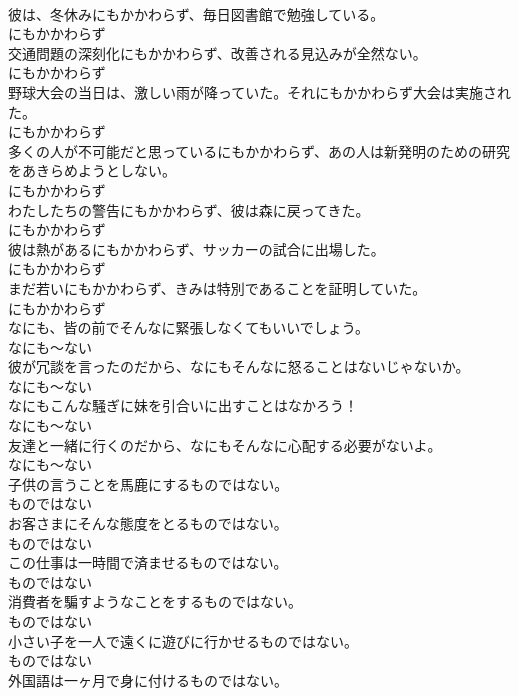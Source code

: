 \documentclass[8pt]{extreport}
\begin{document}
\begin{CJK}{UTF8}{min}
\\	彼は、冬休みにもかかわらず、毎日図書館で勉強している。	
\\	にもかかわらず
\\	交通問題の深刻化にもかかわらず、改善される見込みが全然ない。	
\\	にもかかわらず
\\	野球大会の当日は、激しい雨が降っていた。それにもかかわらず大会は実施された。	
\\	にもかかわらず
\\	多くの人が不可能だと思っているにもかかわらず、あの人は新発明のための研究をあきらめようとしない。	
\\	にもかかわらず
\\	わたしたちの警告にもかかわらず、彼は森に戻ってきた。	
\\	にもかかわらず
\\	彼は熱があるにもかかわらず、サッカーの試合に出場した。	
\\	にもかかわらず
\\	まだ若いにもかかわらず、きみは特別であることを証明していた。	
\\	にもかかわらず
\\	なにも、皆の前でそんなに緊張しなくてもいいでしょう。	
\\	なにも～ない
\\	彼が冗談を言ったのだから、なにもそんなに怒ることはないじゃないか。	
\\	なにも～ない
\\	なにもこんな騒ぎに妹を引合いに出すことはなかろう！	
\\	なにも～ない
\\	友達と一緒に行くのだから、なにもそんなに心配する必要がないよ。	
\\	なにも～ない
\\	子供の言うことを馬鹿にするものではない。	
\\	ものではない
\\	お客さまにそんな態度をとるものではない。	
\\	ものではない
\\	この仕事は一時間で済ませるものではない。	
\\	ものではない
\\	消費者を騙すようなことをするものではない。	
\\	ものではない
\\	小さい子を一人で遠くに遊びに行かせるものではない。	
\\	ものではない
\\	外国語は一ヶ月で身に付けるものではない。	

\end{CJK}
\end{document}
